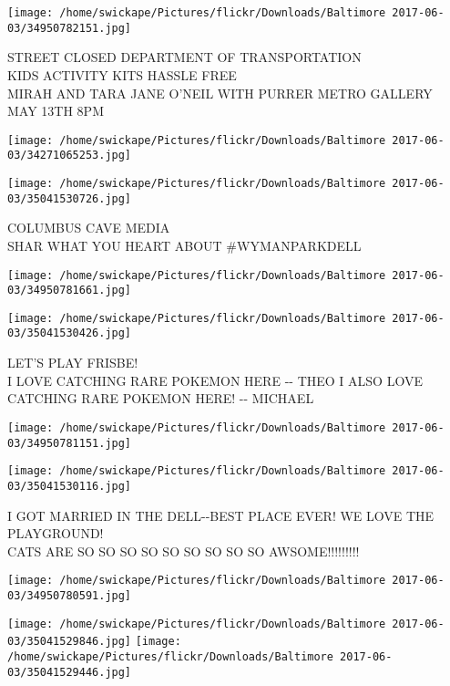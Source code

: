 \documentclass[10pt,letterpaper]{article}
\begin{document}
\texttt{[image: /home/swickape/Pictures/flickr/Downloads/Baltimore 2017-06-03/34950782151.jpg]}

STREET CLOSED DEPARTMENT OF TRANSPORTATION\\
KIDS ACTIVITY KITS HASSLE FREE\\
MIRAH AND TARA JANE O'NEIL WITH PURRER METRO GALLERY MAY 13TH 8PM\\
\pagebreak

\texttt{[image: /home/swickape/Pictures/flickr/Downloads/Baltimore 2017-06-03/34271065253.jpg]}

\vspace{0.25in}
\texttt{[image: /home/swickape/Pictures/flickr/Downloads/Baltimore 2017-06-03/35041530726.jpg]}

COLUMBUS CAVE MEDIA\\
SHAR WHAT YOU HEART ABOUT \#WYMANPARKDELL\\
\pagebreak

\texttt{[image: /home/swickape/Pictures/flickr/Downloads/Baltimore 2017-06-03/34950781661.jpg]}

\vspace{0.25in}
\texttt{[image: /home/swickape/Pictures/flickr/Downloads/Baltimore 2017-06-03/35041530426.jpg]}

LET'S PLAY FRISBE!\\
I LOVE CATCHING RARE POKEMON HERE {-}{-} THEO  I ALSO LOVE CATCHING RARE POKEMON HERE!  {-}{-} MICHAEL\\
\pagebreak

\texttt{[image: /home/swickape/Pictures/flickr/Downloads/Baltimore 2017-06-03/34950781151.jpg]}

\vspace{0.25in}
\texttt{[image: /home/swickape/Pictures/flickr/Downloads/Baltimore 2017-06-03/35041530116.jpg]}

I GOT MARRIED IN THE DELL{-}{-}BEST PLACE EVER!  WE LOVE THE PLAYGROUND!\\
CATS ARE SO SO SO SO SO SO SO SO SO AWSOME!!!!!!!!!\\
\pagebreak

\texttt{[image: /home/swickape/Pictures/flickr/Downloads/Baltimore 2017-06-03/34950780591.jpg]}

\vspace{0.25in}
\texttt{[image: /home/swickape/Pictures/flickr/Downloads/Baltimore 2017-06-03/35041529846.jpg]}
\texttt{[image: /home/swickape/Pictures/flickr/Downloads/Baltimore 2017-06-03/35041529446.jpg]}
\end{document}
